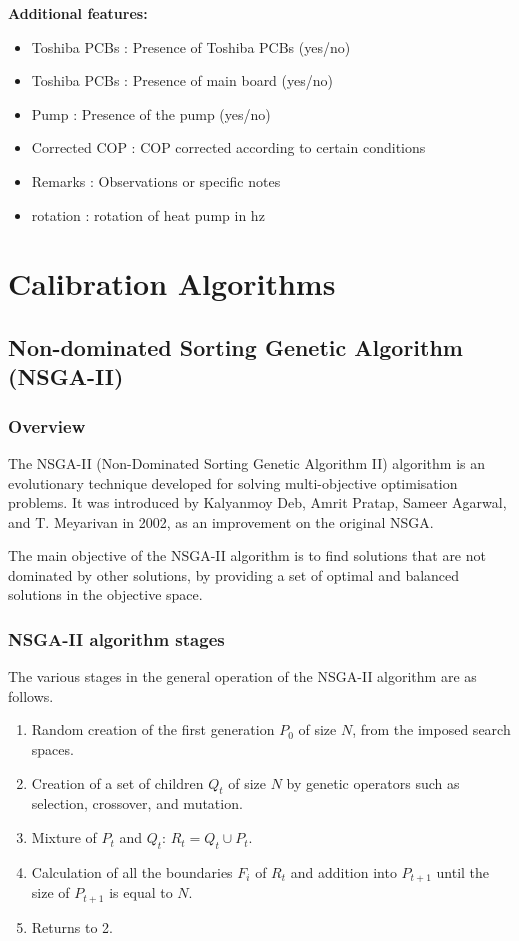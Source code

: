 \documentclass{report}
\begin{document}
\textbf{Additional features:}
\begin{itemize}
    \item Toshiba PCBs : Presence of Toshiba PCBs (yes/no)
    \item Toshiba PCBs : Presence of main board (yes/no)
    \item Pump : Presence of the pump (yes/no)
    \item Corrected COP : COP corrected according to certain conditions
    \item Remarks : Observations or specific notes
    \item rotation : rotation of heat pump in hz
\end{itemize}

\section{Calibration Algorithms}

\subsection{ Non-dominated Sorting Genetic Algorithm (NSGA-II)}
\subsubsection{Overview}
The NSGA-II (Non-Dominated Sorting Genetic Algorithm II) algorithm is an evolutionary technique 
developed for solving multi-objective optimisation problems. It was introduced by Kalyanmoy Deb, 
Amrit Pratap, Sameer Agarwal, and T. Meyarivan in 2002, as an improvement on the original NSGA.

The main objective of the NSGA-II algorithm is to find solutions that are not dominated by other 
solutions, by providing a set of optimal and balanced solutions in the objective space.


\subsubsection{NSGA-II algorithm stages}

The various stages in the general operation of the NSGA-II algorithm are as follows.
\begin{enumerate}[label=\arabic*.]
    \item Random creation of the first generation \(P_0\) of size \(N\), from the imposed search spaces.
    \item Creation of a set of children \(Q_t\) of size \(N\) by genetic operators such as selection, crossover, and mutation.
    \item Mixture of \(P_t\) and \(Q_t\): \(R_t = Q_t \cup P_t\).
    \item Calculation of all the boundaries \(F_i\) of \(R_t\) and addition into \(P_{t+1}\) until the size of \(P_{t+1}\) is equal to \(N\).
    \item Returns to 2.
\end{enumerate}
\end{document}

